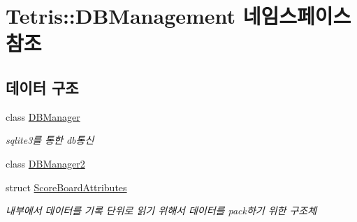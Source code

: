 \hypertarget{namespace_tetris_1_1_d_b_management}{}\section{Tetris\+:\+:D\+B\+Management 네임스페이스 참조}
\label{namespace_tetris_1_1_d_b_management}
\subsection*{데이터 구조}
\begin{DoxyCompactItemize}
\item 
class \hyperlink{class_tetris_1_1_d_b_management_1_1_d_b_manager}{D\+B\+Manager}
\begin{DoxyCompactList}\small\item\em sqlite3를 통한 db통신 \end{DoxyCompactList}\item 
class \hyperlink{class_tetris_1_1_d_b_management_1_1_d_b_manager2}{D\+B\+Manager2}
\item 
struct \hyperlink{struct_tetris_1_1_d_b_management_1_1_score_board_attributes}{Score\+Board\+Attributes}
\begin{DoxyCompactList}\small\item\em 내부에서 데이터를 기록 단위로 읽기 위해서 데이터를 pack하기 위한 구조체 \end{DoxyCompactList}\end{DoxyCompactItemize}
